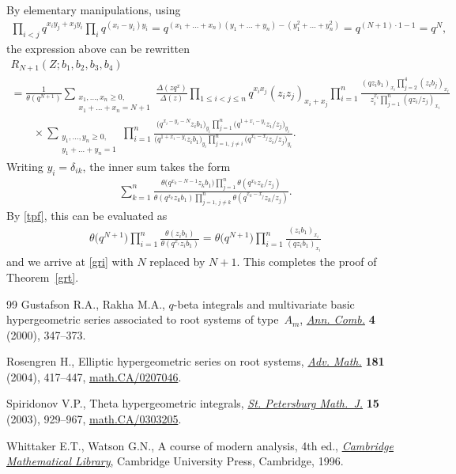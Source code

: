 \documentclass[11pt]{article}
\numberwithin{equation}{section}
\begin{document}
By elementary manipulations, using
\begin{gather*}\prod\limits_{i<j}q^{x_iy_j+x_jy_i}\prod\limits_i q^{(x_i-y_i)y_i}=q^{(x_1+\dots+x_n)(y_1+\dots+y_n)-(y_1^2+\dots+y_n^2)}=q^{(N+1)\cdot 1-1}=q^N, \end{gather*}
the expression above can be rewritten
\begin{gather*}R_{N+1}(Z;b_1,b_2,b_3,b_4)\\
=\frac{1}{\theta(q^{N+1})}\sum_{\substack{x_1,\dots,x_n\geq 0,\\x_1+\dots+x_n=N+1}}
\frac{\Delta(zq^{x})}{\Delta(z)}\prod\limits_{1\leq i<j\leq n}q^{x_ix_j}(z_iz_j)_{x_i+x_j}
\prod\limits_{i=1}^n\frac{(qz_ib_1)_{x_i}\prod\limits_{j=2}^4(z_ib_j)_{x_i}}{z_i^{x_i}\prod\limits_{j=1}^n(qz_i/z_j)_{x_i}}
\\
\qquad{} \times\sum_{\substack{y_1,\dots,y_n\geq 0,\\y_1+\dots+y_n=1}}\prod\limits_{i=1}^n
\frac{\big(q^{x_i-y_i-N}z_ib_1\big)_{y_i}\prod\limits_{j=1}^n\big(q^{1+x_i-y_i}z_i/z_j\big)_{y_i}}{\big(q^{1+x_i-y_i}z_ib_1\big)_{y_i}
\prod\limits_{j=1,\,j\neq i}^n\big(q^{x_i-x_j}z_i/z_j\big)_{y_i}}.
\end{gather*}
Writing $y_i=\delta_{ik}$, the inner sum takes the form
\begin{gather*}\sum_{k=1}^n\frac{\theta\big(q^{x_k-N-1}z_kb_1\big)\prod\limits_{j=1}^n\theta(q^{x_k}z_k/z_j)}{\theta(q^{x_k}z_kb_1)\prod\limits_{j=1,\,j\neq k}^n\theta(q^{x_k-x_j}z_k/z_j)}. \end{gather*}
By \eqref{tpf}, this can be evaluated as{\samepage
\begin{gather*}
\theta\big(q^{N+1}\big)\prod\limits_{i=1}^n\frac{\theta(z_ib_1)}{\theta(q^{x_i}z_ib_1)}=\theta\big(q^{N+1}\big)
\prod\limits_{i=1}^n\frac{(z_ib_1)_{x_i}}{(qz_ib_1)_{x_i}}\end{gather*}
and we arrive at \eqref{gri} with $N$ replaced by $N+1$. This completes the proof of Theorem~\ref{grt}.}
\begin{thebibliography}{99}
Gustafson R.A., Rakha M.A., {$q$}-beta integrals and multivariate basic
 hypergeometric series associated to root systems of type~{$A_m$},
 \href{https://doi.org/10.1007/PL00001285}{\textit{Ann. Comb.}} \textbf{4} (2000), 347--373.

Rosengren H., Elliptic hypergeometric series on root systems, \href{https://doi.org/10.1016/S0001-8708(03)00071-9}{\textit{Adv.
 Math.}} \textbf{181} (2004), 417--447, \href{http://arxiv.org/abs/math.CA/0207046}{math.CA/0207046}.


Spiridonov V.P., Theta hypergeometric integrals, \href{https://doi.org/10.1090/S1061-0022-04-00839-8}{\textit{St. Petersburg
 Math.~J.}} \textbf{15} (2003), 929--967, \href{http://arxiv.org/abs/math.CA/0303205}{math.CA/0303205}.

Whittaker E.T., Watson G.N., A course of modern analysis, 4th ed., \href{https://doi.org/10.1017/CBO9780511608759}{\textit{Cambridge
 Mathematical Library}}, Cambridge University Press, Cambridge, 1996.

\end{thebibliography}
\end{document}
